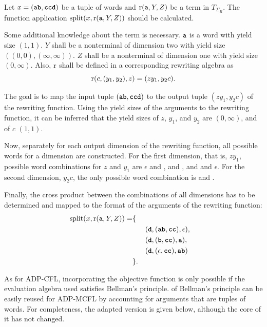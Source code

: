 \documentclass[
    a4paper,
    12pt,
    twoside,
    BCOR=12mm,
    parskip=half,
    chapterprefix,
    numbers=noenddot,
    bibliography=totoc
]{scrbook}
\begin{document}
\begin{example}
  \label{ex:split}
	Let $x=(\ts{ab},\ts{ccd})$ be a tuple of words and $\op{r}(\ts{a},Y,Z)$ be a term in $T_{\Sigma_R}$. The function application $\op{split}(x,\op{r}(\ts{a},Y,Z))$ should be calculated.
	
	Some additional knowledge about the term is necessary. $\ts{a}$ is a word with yield size $(1,1)$. $Y$ shall be a nonterminal of dimension two with yield size $((0,0),(\infty,\infty))$. $Z$ shall be a nonterminal of dimension one with yield size $(0,\infty)$. Also, $\mathrm{r}$ shall be defined in a corresponding rewriting algebra as 
		\[ \mathrm{r}(c,(y_1,y_2),z)=(z y_1,y_2 c). \]
	
	The goal is to map the input tuple $(\ts{ab},\ts{ccd})$ to the output tuple $(z y_1,y_2 c)$ of the rewriting function. Using the yield sizes of the arguments to the rewriting function, it can be inferred that the yield sizes of $z$, $y_1$, and $y_2$ are $(0,\infty)$, and of $c$ $(1,1)$.
	
	Now, separately for each output dimension of the rewriting function, all possible words for a dimension are constructed. For the first dimension, that is, $z y_1$, possible word combinations for $z$ and $y_1$ are $\epsilon$ and ,  and , and  and $\epsilon$. For the second dimension, $y_2 c$, the only possible word combination is  and .
	
	Finally, the cross product between the combinations of all dimensions has to be determined and  mapped to the format of the arguments of the rewriting function:
	\begin{align*}
		\op{split}(x,\op{r}(\ts{a},Y,Z)) = &\{\\
		&&&(\ts{d},(\ts{ab},\ts{cc}),\epsilon),\\
		&&&(\ts{d},(\ts{b},\ts{cc}),\ts{a}),\\
		&&&(\ts{d},(\epsilon,\ts{cc}),\ts{ab})\\
		&\}.
	\end{align*}
\end{example}

As for ADP-CFL, incorporating the objective function is only possible if the evaluation algebra used satisfies Bellman's principle.  of Bellman's principle can be easily reused for ADP-MCFL by accounting for arguments that are tuples of words. For completeness, the adapted version is given below, although the core of it has not changed.
\end{document}
